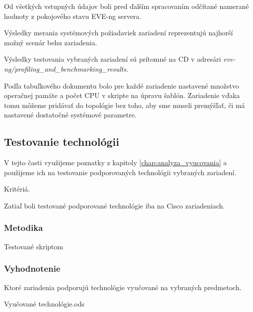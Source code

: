 Od všetkých vstupných údajov boli pred ďalším spracovaním odčítané namerané hodnoty z pokojového stavu EVE-ng servera.

Výsledky merania systémových požiadaviek zariadení reprezentujú najhorší možný scenár behu zariadenia.

Výsledky testovania vybraných zariadení sú prítomné na CD v adresári \emph{eve-ng/profiling\_and\_benchmarking\_results}.

Podľa tabuľkového dokumentu bolo pre každé zariadenie nastavené množstvo operačnej pamäte a počet CPU v skripte na úpravu šablón. Zariadenie vďaka tomu môžeme pridávať do topológie bez toho, aby sme museli premýšľať, či má nastavené dostatočné systémové parametre.




\subsection{Testovanie technológii}
\label{chap:testovanie_technologii}

V tejto časti využijeme poznatky z kapitoly \ref{chap:analyza_vyucovania} a použijeme ich na testovanie podporovaných technológii vybraných zariadení.

Kritériá.

Zatiaľ boli testované podporované technológie iba na Cisco zariadeniach.

\subsubsection{Metodika}

Testované skriptom

\subsubsection{Vyhodnotenie}

Ktoré zariadenia podporujú technológie vyučované na vybraných predmetoch.

Vyučované technológie.ods